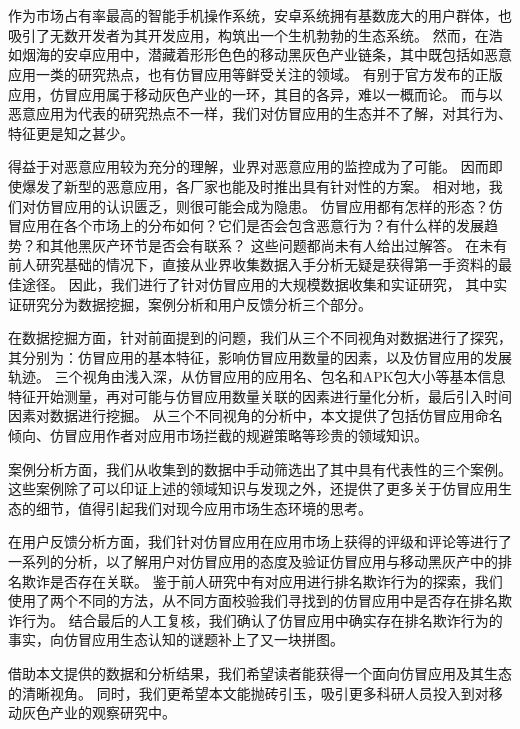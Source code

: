 
\chapter*{}
\vspace{-5mm}

\setlength{\baselineskip}{25pt} %

作为市场占有率最高的智能手机操作系统，安卓系统拥有基数庞大的用户群体，也吸引了无数开发者为其开发应用，构筑出一个生机勃勃的生态系统。
然而，在浩如烟海的安卓应用中，潜藏着形形色色的移动黑灰色产业链条，其中既包括如恶意应用一类的研究热点，也有仿冒应用等鲜受关注的领域。
有别于官方发布的正版应用，仿冒应用属于移动灰色产业的一环，其目的各异，难以一概而论。
而与以恶意应用为代表的研究热点不一样，我们对仿冒应用的生态并不了解，对其行为、特征更是知之甚少。

得益于对恶意应用较为充分的理解，业界对恶意应用的监控成为了可能。
因而即使爆发了新型的恶意应用，各厂家也能及时推出具有针对性的方案。
相对地，我们对仿冒应用的认识匮乏，则很可能会成为隐患。
仿冒应用都有怎样的形态？仿冒应用在各个市场上的分布如何？它们是否会包含恶意行为？有什么样的发展趋势？和其他黑灰产环节是否会有联系？
这些问题都尚未有人给出过解答。
在未有前人研究基础的情况下，直接从业界收集数据入手分析无疑是获得第一手资料的最佳途径。
因此，我们进行了针对仿冒应用的大规模数据收集和实证研究，
其中实证研究分为数据挖掘，案例分析和用户反馈分析三个部分。

在数据挖掘方面，针对前面提到的问题，我们从三个不同视角对数据进行了探究，其分别为：仿冒应用的基本特征，影响仿冒应用数量的因素，以及仿冒应用的发展轨迹。
三个视角由浅入深，从仿冒应用的应用名、包名和APK包大小等基本信息特征开始测量，再对可能与仿冒应用数量关联的因素进行量化分析，最后引入时间因素对数据进行挖掘。
从三个不同视角的分析中，本文提供了包括仿冒应用命名倾向、仿冒应用作者对应用市场拦截的规避策略等珍贵的领域知识。

案例分析方面，我们从收集到的数据中手动筛选出了其中具有代表性的三个案例。
这些案例除了可以印证上述的领域知识与发现之外，还提供了更多关于仿冒应用生态的细节，值得引起我们对现今应用市场生态环境的思考。

在用户反馈分析方面，我们针对仿冒应用在应用市场上获得的评级和评论等进行了一系列的分析，以了解用户对仿冒应用的态度及验证仿冒应用与移动黑灰产中的排名欺诈是否存在关联。
鉴于前人研究中有对应用进行排名欺诈行为的探索，我们使用了两个不同的方法，从不同方面校验我们寻找到的仿冒应用中是否存在排名欺诈行为。
结合最后的人工复核，我们确认了仿冒应用中确实存在排名欺诈行为的事实，向仿冒应用生态认知的谜题补上了又一块拼图。

借助本文提供的数据和分析结果，我们希望读者能获得一个面向仿冒应用及其生态的清晰视角。
同时，我们更希望本文能抛砖引玉，吸引更多科研人员投入到对移动灰色产业的观察研究中。

 
